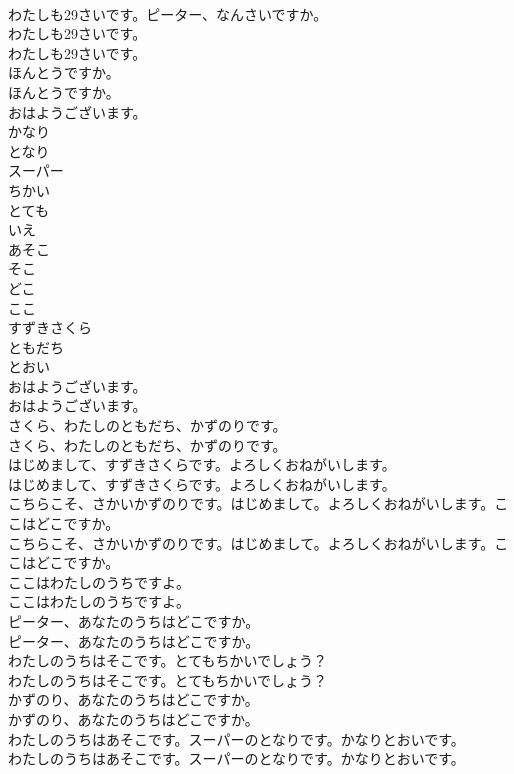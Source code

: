 \documentclass[8pt]{extreport}
\begin{document}
\begin{CJK}{UTF8}{min}
\\	わたしも29さいです。ピーター、なんさいですか。 
\\	わたしも29さいです。	
\\	わたしも29さいです。 
\\	ほんとうですか。	
\\	ほんとうですか。 
\\	おはようございます。
\\	かなり
\\	となり
\\	スーパー
\\	ちかい
\\	とても
\\	いえ
\\	あそこ
\\	そこ
\\	どこ
\\	ここ
\\	すずきさくら
\\	ともだち
\\	とおい
\\	おはようございます。	
\\	おはようございます。 
\\	さくら、わたしのともだち、かずのりです。	
\\	さくら、わたしのともだち、かずのりです。 
\\	はじめまして、すずきさくらです。よろしくおねがいします。	
\\	はじめまして、すずきさくらです。よろしくおねがいします。 
\\	こちらこそ、さかいかずのりです。はじめまして。よろしくおねがいします。ここはどこですか。	
\\	こちらこそ、さかいかずのりです。はじめまして。よろしくおねがいします。ここはどこですか。 
\\	ここはわたしのうちですよ。	
\\	ここはわたしのうちですよ。 
\\	ピーター、あなたのうちはどこですか。	
\\	ピーター、あなたのうちはどこですか。 
\\	わたしのうちはそこです。とてもちかいでしょう？	
\\	わたしのうちはそこです。とてもちかいでしょう？ 
\\	かずのり、あなたのうちはどこですか。	
\\	かずのり、あなたのうちはどこですか。 
\\	わたしのうちはあそこです。スーパーのとなりです。かなりとおいです。	
\\	わたしのうちはあそこです。スーパーのとなりです。かなりとおいです。 

\end{CJK}
\end{document}
